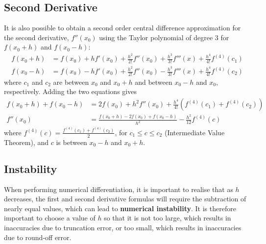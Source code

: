 \documentclass{article}
\begin{document}
\subsection{Second Derivative}
It is also possible to obtain a second order central difference
approximation for the second derivative, \(f''\left( x_0 \right)\)
using the Taylor polynomial of degree 3 for \(f\left( x_0 + h \right)\)
and \(f\left( x_0 - h \right)\):
\begin{align*}
    f\left( x_0 + h \right) & = f\left( x_0 \right) + h f'\left( x_0 \right) + \frac{h^2}{2!} f''\left( x_0 \right) + \frac{h^3}{3!} f'''\left( x \right) + \frac{h^4}{4!} f^{\left( 4 \right)}\left( c_1 \right) \\
    f\left( x_0 - h \right) & = f\left( x_0 \right) - h f'\left( x_0 \right) + \frac{h^2}{2!} f''\left( x_0 \right) - \frac{h^3}{3!} f'''\left( x \right) + \frac{h^4}{4!} f^{\left( 4 \right)}\left( c_2 \right)
\end{align*}
where \(c_1\) and \(c_2\) are between \(x_0\) and \(x_0 + h\) and
between \(x_0 - h\) and \(x_0\), respectively. Adding the two equations
gives
\begin{align*}
    f\left( x_0 + h \right) + f\left( x_0 - h \right) & = 2f\left( x_0 \right) + h^2 f''\left( x_0 \right) + \frac{h^4}{4!} \left( f^{\left( 4 \right)}\left( c_1 \right) + f^{\left( 4 \right)}\left( c_2 \right) \right) \\
    f''\left( x_0 \right)                             & = \frac{f\left( x_0 + h \right) - 2f\left( x_0 \right) + f\left( x_0 - h \right)}{h^2} - \frac{h^2}{12} f^{\left( 4 \right)}\left( c \right)
\end{align*}
where \(f^{\left( 4 \right)}\left( c \right) =
\frac{f^{\left( 4 \right)}\left( c_1 \right) +
    f^{\left( 4 \right)}\left( c_2 \right)}{2}\), for
\(c_1 \leq c \leq c_2\) (Intermediate Value Theorem), and \(c\) is
between \(x_0 - h\) and \(x_0 + h\).
\subsection{Instability}
When performing numerical differentiation, it is important to realise
that as \(h\) decreases, the first and second derivative formulas will
require the subtraction of nearly equal values, which can lead to
\textbf{numerical instability}. It is therefore important to choose a
value of \(h\) so that it is not too large, which results in
inaccuracies due to truncation error, or too small, which results in
inaccuracies due to round-off error.
\end{document}
